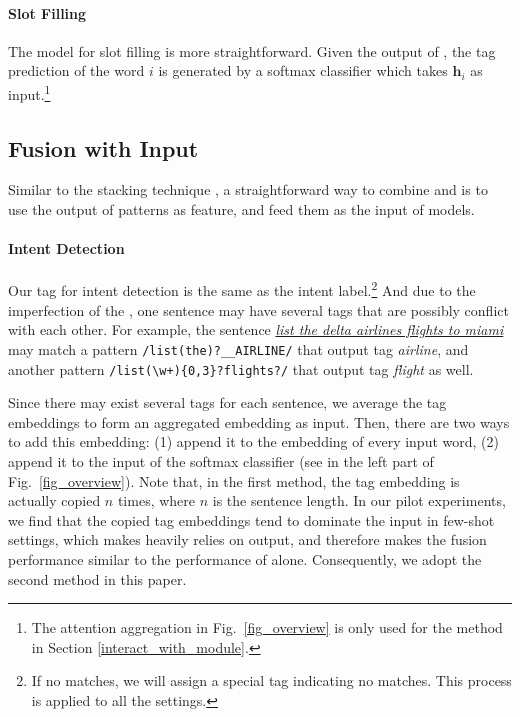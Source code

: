 \paragraph{Slot Filling}
The model for slot filling is more straightforward. Given the output of \BLSTM, the tag prediction of the word $i$ is generated by a softmax classifier which takes $\textbf{h}_i$ as input.\footnote{The attention aggregation in Fig.~\ref{fig_overview} is only used for the method in Section \ref{interact_with_module}.}


\subsection{Fusion with Input}
\label{fusion_with_input}
Similar to the stacking technique \cite{wolpert1992stacked}, a straightforward way to combine \RE and \NN is to use the output of \RE patterns as feature, and feed them as the input of \NN models.
\paragraph{Intent Detection}
Our \RE tag for intent detection is the same as the intent label.\footnote{If no \RE matches, we will assign a special tag indicating no matches. This process is applied to all the settings.} 
And due to the imperfection of the \RE, one sentence may have several \RE tags that are possibly conflict with each other.
For example, the sentence \textsl{\underline{list the delta airlines flights to miami}} may match a pattern \texttt{/list(\;the)?\;\_\_AIRLINE/} that output tag \emph{airline}, 
and another pattern \texttt{/list(\;\textbackslash w+)\{0,3\}?\;flights?/} that output tag \emph{flight} as well.

Since there may exist several \RE tags for each sentence, we average the tag embeddings to form an aggregated embedding as input. 
Then, there are two ways to add this embedding: (1) append it to the embedding of every input word, (2) append it to the input of the softmax classifier (see  in the left part of Fig.~\ref{fig_overview}).
Note that, in the first method, the tag embedding is actually copied $n$ times, where $n$ is the sentence length. 
In our pilot experiments, we find that the copied tag embeddings tend to dominate the input in few-shot settings, which makes \NN heavily relies on \RE output, and therefore makes the fusion performance similar to the performance of \RE alone. Consequently, we adopt the second method in this paper.

